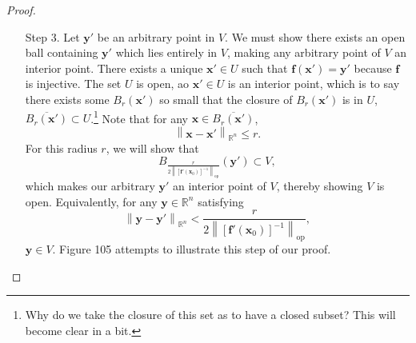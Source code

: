 \documentclass{article}
\newcommand{\R}{\mathbb{R}}
\newcommand{\x}{\mathbf{x}}
\newcommand{\f}{\mathbf{f}}
\newcommand{\y}{\mathbf{y}}
\newcommand{\norm}[1]{\left\lVert#1\right\rVert}
\newcommand{\normop}[1]{\left\lVert#1\right\rVert_\text{op}}
\theoremstyle{definition}
\begin{document}
\begin{proof}
\begin{enumerate}
			\item [Step 3.] Let $ \y'$ be an arbitrary point in $ V $. We must show there exists an open ball containing $ \y' $ which lies entirely in  $ V $, making any arbitrary point of $ V $ an interior point.  There exists a unique $ \x'\in U $ such that $ \f(\x')=\y' $ because $ \f $ is injective. The set $ U $ is open, ao $ \x'\in U $ is an interior point, which is to say there exists some $ B_r(\x') $ so small that the closure of $ B_r(\x') $ is in $ U $, $ \overline{B_r(\x')}\subset U $.\footnote{Why do we take the closure of this set as to have a closed subset? This will become clear in a bit.} Note that for any $ \x \in \overline{B_r(\x')} $, 
			\begin{equation}\label{key}
				\norm{\x-\x'}_{\R^n} \le r.
			\end{equation}
			For this radius $ r $, we will show that $$ B_{\frac{r}{2\normop{[\f'(\x_0)]^{-1}}}}(\y')\subset V ,$$ which makes our arbitrary $ \y' $ an interior point of $ V $, thereby showing $ V $ is open. Equivalently, for any $ \y\in \R^n $ satisfying
			\begin{equation}\label{key}
				\norm{\y-\y'}_{\R^n} < \frac{r}{2\normop{[\f'(\x_0)]^{-1}}},
			\end{equation}
			$ \y\in V $. Figure 105 attempts to illustrate this step of our proof.
			
			
			\begin{figure}[h!]
				\centering
\end{figure}
\end{enumerate}
\end{proof}
\end{document}
